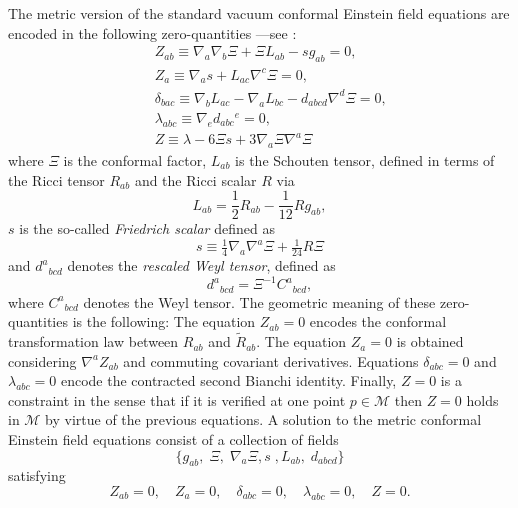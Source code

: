 \documentclass[10pt,a4paper]{article}
\theoremstyle{plain}
\begin{document}
\medskip

The metric version of the standard vacuum conformal 
Einstein field equations are encoded in the following zero-quantities
  ---see \cite{Fri81a,Fri81b,Fri82,Fri83}:
\begin{subequations}
\begin{eqnarray}
&& Z_{ab} \equiv \nabla_{a}\nabla_{b}\Xi  +\Xi L_{ab} - s g_{ab}=0 ,
 \label{StandardCEFEsecondderivativeCF}\\
&& Z_{a} \equiv \nabla_{a}s +L_{ac} \nabla ^{c}\Xi=0 , \label{standardCEFEs}\\
&& \delta_{bac} \equiv \nabla_{b}L_{ac}-\nabla_{a}L_{bc} -
 d_{abcd}\nabla^d{}\Xi =0 , \label{standardCEFESchouten}\\
&& \lambda_{abc}\equiv \nabla_{e}d_{abc}{}^{e}=0 , \label{standardCEFErescaledWeyl}\\
&& Z \equiv \lambda - 6 \Xi s + 3 \nabla_{a}\Xi \nabla^{a}\Xi
\label{standardCFEconstraintFriedrichScalar}
\end{eqnarray}
\end{subequations}
where $\Xi$ is the conformal factor, $L_{ab}$ is the Schouten tensor,
defined in terms of the Ricci tensor $R_{ab}$ and the Ricci scalar $R$
via
\begin{equation}\label{SchoutenDefinition}
L_{ab}=\frac{1}{2}R_{ab}-\frac{1}{12}Rg_{ab},
\end{equation}
 $s$ is the so-called \emph{Friedrich scalar} defined as
\begin{equation}\label{s-definition}
s\equiv \tfrac{1}{4}\nabla_{a}\nabla^{a}\Xi + \tfrac{1}{24}R\Xi
\end{equation}
and $d^{a}{}_{bcd}$ denotes the \emph{rescaled Weyl tensor}, defined
as
\[d^{a}{}_{bcd}=\Xi^{-1}C^{a}{}_{bcd},\]
where $C^{a}{}_{bcd}$ denotes the Weyl tensor.  The geometric meaning
of these zero-quantities is the following: The equation $Z_{ab}=0$
encodes the conformal transformation law between ${R}_{ab}$ and
$\tilde{R}_{ab}$.  The equation $Z_{a}=0$ is obtained considering
$\nabla^{a}Z_{ab}$ and commuting covariant derivatives.  Equations
$\delta_{abc}=0$ and $\lambda_{abc}=0$ encode the contracted second
Bianchi identity. Finally, $Z=0$ is a constraint in the sense that if
it is verified at one point $p\in\mathcal{M}$ then $Z=0$ holds in
$\mathcal{M}$ by virtue of the previous equations.  A solution to the
metric conformal Einstein field equations consist of a collection of
fields
\[
\{g_{ab}, \; \Xi, \; \nabla_{a}\Xi,s\;,L_{ab},\; d_{abcd}\}
\]
satisfying
\[ Z_{ab}=0, \quad Z_{a}=0, \quad \delta_{abc}=0, \quad \lambda_{abc}=0, \quad Z=0.  \]
\end{document}
